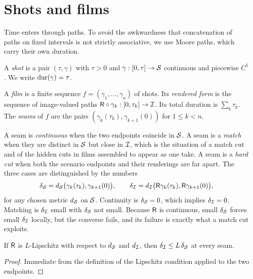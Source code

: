 \section{Shots and films}

Time enters through paths. To avoid the awkwardness that concatenation of paths on fixed intervals is not strictly associative, we use Moore paths, which carry their own duration.

\begin{definition}[Shot]
A \emph{shot} is a pair $(\tau,\gamma)$ with $\tau>0$ and $\gamma:[0,\tau]\to\mathcal{S}$ continuous and piecewise $C^1$. We write $\operatorname{dur}(\gamma)=\tau$.
\end{definition}

\begin{definition}[Film]
A \emph{film} is a finite sequence $f=(\gamma_1,\dots,\gamma_n)$ of shots. Its \emph{rendered form} is the sequence of image-valued paths $\mathsf{R}\circ\gamma_k:[0,\tau_k]\to\mathcal{I}$. Its total duration is $\sum_k\tau_k$. The \emph{seams} of $f$ are the pairs $(\gamma_k(\tau_k),\gamma_{k+1}(0))$ for $1\le k<n$.
\end{definition}

A seam is \emph{continuous} when the two endpoints coincide in $\mathcal{S}$. A seam is a \emph{match} when they are distinct in $\mathcal{S}$ but close in $\mathcal{I}$, which is the situation of a match cut and of the hidden cuts in films assembled to appear as one take. A seam is a \emph{hard cut} when both the scenario endpoints and their renderings are far apart. The three cases are distinguished by the numbers
\[
\delta_{\mathcal{S}}=d_{\mathcal{S}}\bigl(\gamma_k(\tau_k),\gamma_{k+1}(0)\bigr),\qquad
\delta_{\mathcal{I}}=d_{\mathcal{I}}\bigl(\mathsf{R}\gamma_k(\tau_k),\mathsf{R}\gamma_{k+1}(0)\bigr),
\]
for any chosen metric $d_{\mathcal{S}}$ on $\mathcal{S}$. Continuity is $\delta_{\mathcal{S}}=0$, which implies $\delta_{\mathcal{I}}=0$. Matching is $\delta_{\mathcal{I}}$ small with $\delta_{\mathcal{S}}$ not small. Because $\mathsf{R}$ is continuous, small $\delta_{\mathcal{S}}$ forces small $\delta_{\mathcal{I}}$ locally, but the converse fails, and its failure is exactly what a match cut exploits.

\begin{proposition}\label{prop:seam-lipschitz}
If $\mathsf{R}$ is $L$-Lipschitz with respect to $d_{\mathcal{S}}$ and $d_{\mathcal{I}}$, then $\delta_{\mathcal{I}}\le L\,\delta_{\mathcal{S}}$ at every seam.
\end{proposition}

\begin{proof}
Immediate from the definition of the Lipschitz condition applied to the two endpoints.
\end{proof}


